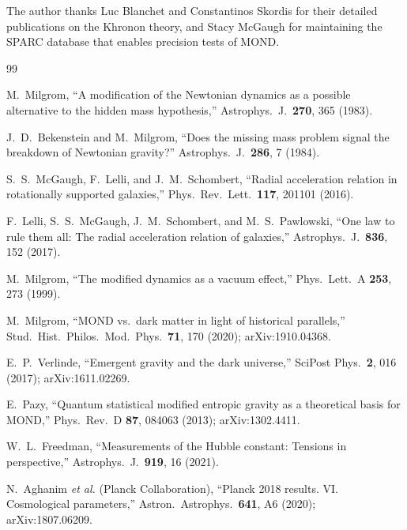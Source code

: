 \documentclass[prl,twocolumn,superscriptaddress,longbibliography]{revtex4-2}
\begin{document}
\begin{acknowledgments}
The author thanks Luc Blanchet and Constantinos Skordis
for their detailed publications on the Khronon
theory, and Stacy McGaugh for maintaining the SPARC
database that enables precision tests of MOND.
\end{acknowledgments}


\begin{thebibliography}{99}

M.~Milgrom,
``A modification of the Newtonian dynamics as a possible
alternative to the hidden mass hypothesis,''
Astrophys.\ J.\ \textbf{270}, 365 (1983).

J.~D.~Bekenstein and M.~Milgrom,
``Does the missing mass problem signal the breakdown
of Newtonian gravity?''
Astrophys.\ J.\ \textbf{286}, 7 (1984).

S.~S.~McGaugh, F.~Lelli, and J.~M.~Schombert,
``Radial acceleration relation in rotationally supported
galaxies,''
Phys.\ Rev.\ Lett.\ \textbf{117}, 201101 (2016).

F.~Lelli, S.~S.~McGaugh, J.~M.~Schombert, and
M.~S.~Pawlowski,
``One law to rule them all: The radial acceleration
relation of galaxies,''
Astrophys.\ J.\ \textbf{836}, 152 (2017).

M.~Milgrom,
``The modified dynamics as a vacuum effect,''
Phys.\ Lett.\ A \textbf{253}, 273 (1999).

M.~Milgrom,
``MOND vs.\ dark matter in light of historical parallels,''
Stud.\ Hist.\ Philos.\ Mod.\ Phys.\ \textbf{71}, 170 (2020);
arXiv:1910.04368.

E.~P.~Verlinde,
``Emergent gravity and the dark universe,''
SciPost Phys.\ \textbf{2}, 016 (2017);
arXiv:1611.02269.

E.~Pazy,
``Quantum statistical modified entropic gravity as a
theoretical basis for MOND,''
Phys.\ Rev.\ D \textbf{87}, 084063 (2013);
arXiv:1302.4411.

W.~L.~Freedman,
``Measurements of the Hubble constant: Tensions in
perspective,''
Astrophys.\ J.\ \textbf{919}, 16 (2021).

N.~Aghanim \textit{et al.} (Planck Collaboration),
``Planck 2018 results. VI. Cosmological parameters,''
Astron.\ Astrophys.\ \textbf{641}, A6 (2020);
arXiv:1807.06209.


\end{thebibliography}
\end{document}

